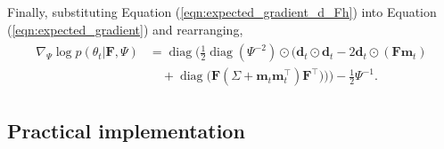 \documentclass[msc,deptreport.inf]{infthesis} %
\newcommand{\matr}[1]{\mathbf{#1}}
\newcommand{\diag}{\mathop{\mathrm{diag}}}
\begin{document}
Finally, substituting Equation (\ref{eqn:expected_gradient_d_Fh}) into Equation (\ref{eqn:expected_gradient}) and rearranging, 
\begin{align}
\begin{split}\label{eqn:derivatives_wrt_Psi}
	\nabla_{\Psi} \log p(\theta_t | \matr{F}, \Psi) 
	& = \diag\Bigg(\frac{1}{2} \diag(\Psi^{-2}) \odot \Big(\matr{d}_t \odot \matr{d}_t - 2\matr{d}_t \odot (\matr{F} \matr{m}_t) \\
	& \quad + \diag\big( \matr{F} (\Sigma + \matr{m}_t \matr{m}_t^\intercal) \matr{F}^\intercal \big) \Big) \Bigg)
	 - \frac{1}{2} \Psi^{-1}.
\end{split}
\end{align} 

\subsection{Practical implementation}
\end{document}
